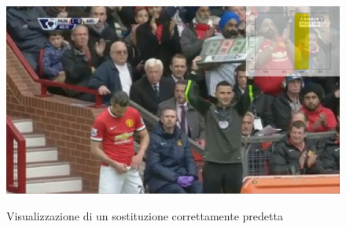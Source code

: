 \begin{figure}[H]
\centering
\caption{Visualizzazione di un sostituzione correttamente predetta}
\includegraphics[width=\linewidth]{img/videosubs.png}
\label{figure : videosub}
\end{figure}
